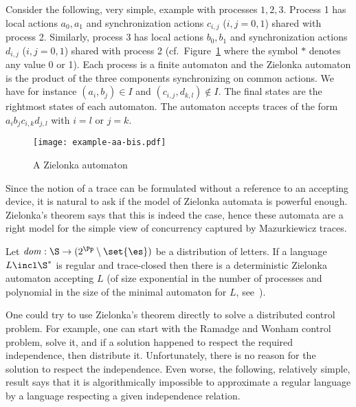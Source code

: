 \documentclass{llncs}
\newcommand{\loc}{\mathit{dom}}
\begin{document}
\begin{example}
  Consider the following, very simple, example with processes
  $1,2,3$. Process 1 has local actions $a_0,a_1$ and synchronization
  actions $c_{i,j}$ ($i,j = 0,1$) shared with process 2. Similarly,
  process 3 has local actions $b_0,b_1$ and synchronization actions
  $d_{i,j}$ ($i,j = 0,1$) shared with process 2
(cf.~Figure~\ref{f:async} where the symbol $*$ denotes any 
value 0 or 1).
Each process is a finite automaton and the Zielonka
automaton is the product of the three components synchronizing on
common actions. 
We have for instance $(a_i,b_j) \in I$ and $(c_{i,j},d_{k,l}) \notin
I$. The final states are the rightmost states of each automaton. The
automaton accepts traces of the form $a_ib_j c_{i,k} d_{j,l}$ with
$i=l$ or $j=k$.
\begin{figure}[htbp]
\centering
\texttt{[image: example-aa-bis.pdf]}
  \caption{A Zielonka automaton}
  \label{f:async}
\end{figure}
\end{example} 








Since the notion of a trace can be formulated without a reference to an
accepting device, it is natural to ask if the model of Zielonka
automata is powerful enough. Zielonka's theorem says that this is
indeed the case, hence these automata are a right model for
the simple view of concurrency captured by Mazurkiewicz traces. 



\begin{theorem}\cite{zie87}
  Let $\loc :\S\to(2^\Pp\setminus\set{\es})$ be a distribution of
  letters. If a language $L\incl \S^*$ is regular and trace-closed then there is a
  deterministic Zielonka automaton accepting $L$ (of size exponential
  in the number of processes and polynomial in the size of the minimal
  automaton for $L$, see~\cite{ggmw10}). 
\end{theorem}

\medskip

One could try to use Zielonka's theorem directly to solve a
distributed control problem. For example, one can start with the
Ramadge and Wonham control problem, solve it, and if a solution happened to
respect the required independence, then distribute
it. Unfortunately, there is no reason for the solution to respect the
independence. Even worse, the following, relatively simple, result
says that it is algorithmically impossible to approximate a
regular language by a language respecting a given independence
relation.
\end{document}
